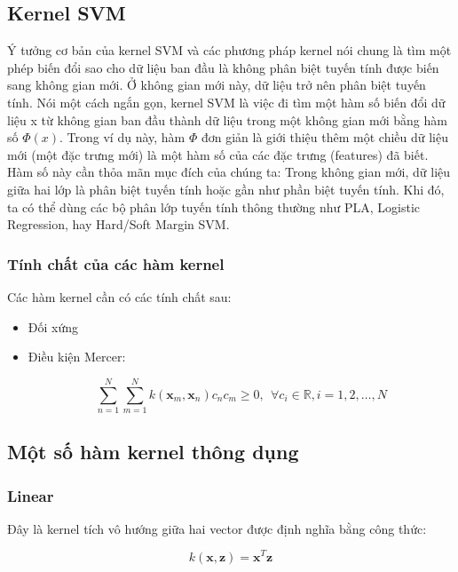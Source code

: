 \documentclass[a4paper, 12pt, oneside]{report}
\begin{document}
\subsection{Kernel SVM}
Ý tưởng cơ bản của kernel SVM và các phương pháp kernel nói chung là tìm một phép biến đổi sao cho dữ liệu ban đầu là không phân biệt tuyến tính được biến sang không gian mới. Ở không gian mới này, dữ liệu trở nên phân biệt tuyến tính.
Nói một cách ngắn gọn, kernel SVM là việc đi tìm một hàm số biến đổi dữ liệu x từ không gian ban đầu thành dữ liệu trong một không gian mới bằng hàm số $\Phi(x)$. Trong ví dụ này, hàm $\Phi$ đơn giản là giới thiệu thêm một chiều dữ liệu mới (một đặc trưng mới) là một hàm số của các đặc trưng (features) đã biết. Hàm số này cần thỏa mãn mục đích của chúng ta: Trong không gian mới, dữ liệu giữa hai lớp là phân biệt tuyến tính hoặc gần như phần biệt tuyến tính. Khi đó, ta có thể dùng các bộ phân lớp tuyến tính thông thường như PLA, Logistic Regression, hay Hard/Soft Margin SVM.
\subsubsection{Tính chất của các hàm kernel}
Các hàm kernel cần có các tính chất sau:
\begin{itemize}
    \item Đối xứng
    \item Điều kiện Mercer:
    \begin{mybox}
    $$\sum_{n=1}^N \sum_{m=1}^N k(\mathbf{x}_m, \mathbf{x}_n) c_nc_m \geq 0, ~~ \forall c_i \in \mathbb{R}, i = 1, 2, \dots, N $$ 
    \end{mybox}
    
\end{itemize}
\subsection {Một số hàm kernel thông dụng}
\subsubsection{Linear}
Đây là kernel tích vô hướng giữa hai vector được định nghĩa bằng công thức: \\

\begin{mybox}
$$k(\mathbf{x}, \mathbf{z}) = \mathbf{x}^T\mathbf{z}$$ 
\end{mybox}
\end{document}
